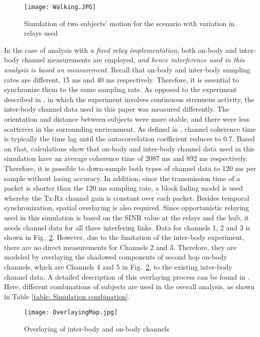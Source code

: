 \documentclass[12pt,draftcls,a4paper,onecolumn,journal]{IEEEtran}
\begin{document}
\begin{figure}[]
\centering
\texttt{[image: Walking.JPG]}
\caption{Simulation of two subjects' motion for the scenario with variation in relays used}
\label{fig: walking}
\end{figure}

In the case of analysis with \emph{a fixed relay implementation}, both on-body and inter-body channel measurements are employed, \emph{and hence interference used in this analysis is based on measurement}. Recall that on-body and inter-body sampling rates are different, 15 ms and 40 ms respectively. Therefore, it is essential to synchronize them to the same sampling rate. As opposed to the experiment described in \cite{David:ElecLetter:2009}, in which the experiment involves continuous strenuous activity, the inter-body channel data used in this paper was measured differently. The orientation and distance between subjects were more stable, and there were less scatterers in the surrounding environment. As defined in \cite{Paulraj:2008}, channel coherence time is typically the time lag until the autocorrelation coefficient reduces to 0.7. Based on that, calculations show that on-body and inter-body channel data used in this simulation have an average coherence time of 2087 ms and 892 ms respectively. Therefore, it is possible to down-sample both types of channel data to 120 ms per sample without losing accuracy. In addition, since the transmission time of a packet is shorter than the 120 ms sampling rate, a block fading model is used whereby the Tx-Rx channel gain is constant over each packet. Besides temporal synchronization, spatial overlaying is also required. Since opportunistic relaying used in this simulation is based on the SINR value at the relays and the hub, it needs channel data for all three interfering links. Data for channels 1, 2 and 3 is shown in Fig.~\ref{fig: Overlaying}. However, due to the limitation of the inter-body experiment, there are no direct measurements for Channels 2 and 3. Therefore, they are modeled by overlaying the shadowed components of second hop on-body channels, which are Channels 4 and 5 in Fig.~\ref{fig: Overlaying}, to the existing inter-body channel data. A detailed description of this overlaying process can be found in \cite{Dong:ICC:2013}. Here, different combinations of subjects are used in the overall analysis, as shown in Table \ref{table: Simulation combination}.


\begin{figure}[]
\centering
\texttt{[image: OverlayingMap.jpg]}
\caption{Overlaying of inter-body and on-body channels}
\label{fig: Overlaying}
\end{figure}
\end{document}
